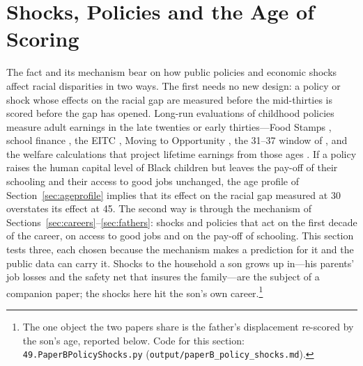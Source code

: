 \section{Shocks, Policies and the Age of Scoring}\label{sec:policy}

The fact and its mechanism bear on how public policies and economic shocks affect racial disparities in two ways. The
first needs no new design: a policy or shock whose effects on the racial gap are measured before the mid-thirties is
scored before the gap has opened. Long-run evaluations of childhood policies measure adult earnings in the late twenties
or early thirties---Food Stamps \citep{hoynes2016long}, school finance \citep{jackson2016effects}, the EITC
\citep{bastian2018long}, Moving to Opportunity \citep{chetty2016effects}, the 31--37 window of \citet{chetty2020race},
and the welfare calculations that project lifetime earnings from those ages \citep{hendren2020unified}. If a policy
raises the human capital level of Black children but leaves the pay-off of their schooling and their access to good
jobs unchanged, the age profile of Section~\ref{sec:ageprofile} implies that its effect on the racial gap measured at 30
overstates its effect at 45. The second way is through the mechanism of Sections~\ref{sec:careers}--\ref{sec:fathers}:
shocks and policies that act on the first decade of the career, on access to good jobs and on the pay-off of schooling.
This section tests three, each chosen because the mechanism makes a prediction for it and the public data can carry it.
Shocks to the household a son grows up in---his parents' job losses and the safety net that insures the family---are the
subject of a companion paper; the shocks here hit the son's own career.\footnote{The one object the two papers share is
the father's displacement re-scored by the son's age, reported below. Code for this section:
\texttt{49.PaperBPolicyShocks.py} (\texttt{output/paperB\_policy\_shocks.md}).}

